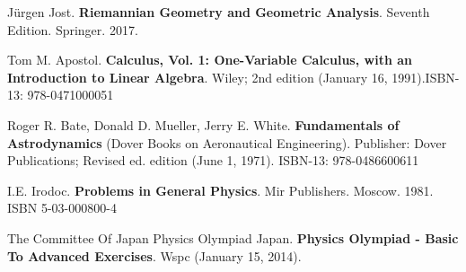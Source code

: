 \documentclass[10pt]{amsart}
\begin{document}
\begin{thebibliography}{9}
J\"{u}rgen Jost. \textbf{Riemannian Geometry and Geometric Analysis}. Seventh Edition. Springer. 2017.

Tom M. Apostol. \textbf{Calculus, Vol. 1: One-Variable Calculus, with an Introduction to Linear Algebra}. Wiley; 2nd edition (January 16, 1991).ISBN-13: 978-0471000051

Roger R. Bate, Donald D. Mueller, Jerry E. White. \textbf{Fundamentals of Astrodynamics} (Dover Books on Aeronautical Engineering). Publisher: Dover Publications; Revised ed. edition (June 1, 1971). ISBN-13: 978-0486600611

I.E. Irodoc. \textbf{Problems in General Physics}. Mir Publishers. Moscow. 1981. ISBN 5-03-000800-4

The Committee Of Japan Physics Olympiad Japan. \textbf{Physics Olympiad - Basic To Advanced Exercises}.
Wspc (January 15, 2014).


\end{thebibliography}
\end{document}
